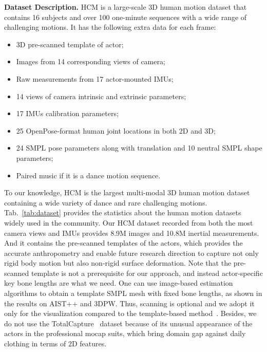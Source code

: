 \documentclass[letterpaper]{article} \usepackage{aaai23}  \usepackage{times}  \usepackage{helvet}  \usepackage{courier}  \usepackage[hyphens]{url}  \usepackage{graphicx} \urlstyle{rm} \def\UrlFont{\rm}  \usepackage{natbib}  \usepackage{caption} \frenchspacing  \setlength{\pdfpagewidth}{8.5in}  \setlength{\pdfpageheight}{11in}  \usepackage{algorithm}
\newcommand{\myparagraph}[1]{\vspace{0.1em}\noindent\textbf{#1}}
\begin{document}
\myparagraph{Dataset Description.}
HCM is a large-scale 3D human motion dataset that contains 16 subjects and over 100 one-minute sequences with a wide range of challenging motions. 
It has the following extra data for each frame:
\begin{itemize} 
\setlength\itemsep{0em}
    \item 3D pre-scanned template of actor;

	\item Images from 14 corresponding views of camera;

	\item Raw measurements from 17 actor-mounted IMUs;

	\item 14 views of camera intrinsic and extrinsic parameters;
	
	\item 17 IMUs calibration parameters;
	
	\item 25 OpenPose-format human joint locations in both 2D and 3D;
	
	\item 24 SMPL pose parameters along with translation and 10 neutral SMPL shape parameters;
	
	\item Paired music if it is a dance motion sequence.

\end{itemize} 



To our knowledge, HCM is the largest multi-modal 3D human motion dataset containing a wide variety of dance and rare challenging motions. 
Tab.~\ref{tab:dataset} provides the statistics about the human motion datasets widely used in the community. 
Our HCM dataset recorded from both the most camera views and IMUs provides 8.9M images and 10.8M inertial measurements. 
And it contains the pre-scanned templates of the actors, which provides the accurate anthropometry and enable future research direction to capture not only rigid body motion but also non-rigid surface deformation.
Note that the pre-scanned template is not a prerequisite for our approach, and instead actor-specific key bone lengths are what we need. One can use image-based estimation algorithms to obtain a template SMPL mesh with fixed bone lengths, as shown in the results on AIST++ and 3DPW. Thus, scanning is optional and we adopt it only for the visualization compared to the template-based method~\cite{challencap}.
Besides, we do not use the TotalCapture~\cite{TotalCapture} dataset because of its unusual appearance of the actors in the professional mocap suits, which bring domain gap against daily clothing in terms of 2D features.
\end{document}

